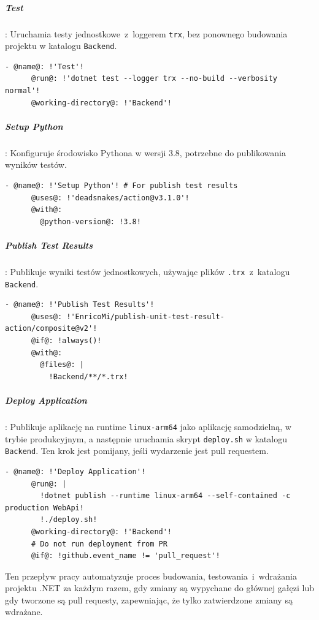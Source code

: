 \subparagraph{Test}: Uruchamia testy jednostkowe~z~loggerem \texttt{\textcolor{codeblue}{trx}}, bez ponownego budowania projektu w katalogu \texttt{\textcolor{codeblue}{Backend}}.
\begin{lstlisting}[style=yaml-colored]
    - @name@: !'Test'!
      @run@: !'dotnet test --logger trx --no-build --verbosity normal'!
      @working-directory@: !'Backend'!
\end{lstlisting}

\subparagraph{Setup Python}: Konfiguruje środowisko Pythona w wersji 3.8, potrzebne do publikowania wyników testów.
\begin{lstlisting}[style=yaml-colored]
    - @name@: !'Setup Python'! # For publish test results
      @uses@: !'deadsnakes/action@v3.1.0'!
      @with@:
        @python-version@: !3.8!
\end{lstlisting}

\subparagraph{Publish Test Results}: Publikuje wyniki testów jednostkowych, używając plików \texttt{\textcolor{codeblue}{.trx}}~z~katalogu \texttt{\textcolor{codeblue}{Backend}}.
\begin{lstlisting}[style=yaml-colored]
    - @name@: !'Publish Test Results'!
      @uses@: !'EnricoMi/publish-unit-test-result-action/composite@v2'!
      @if@: !always()!
      @with@:
        @files@: |
          !Backend/**/*.trx!
\end{lstlisting}

\subparagraph{Deploy Application}: Publikuje aplikację na runtime \texttt{\textcolor{codeblue}{linux-arm64}} jako aplikację samodzielną, w trybie produkcyjnym, a następnie uruchamia skrypt \texttt{\textcolor{codeblue}{deploy.sh}} w katalogu \texttt{\textcolor{codeblue}{Backend}}. Ten krok jest pomijany, jeśli wydarzenie jest pull requestem.
\begin{lstlisting}[style=yaml-colored]
    - @name@: !'Deploy Application'!
      @run@: |
        !dotnet publish --runtime linux-arm64 --self-contained -c production WebApi!
        !./deploy.sh!
      @working-directory@: !'Backend'!
      # Do not run deployment from PR
      @if@: !github.event_name != 'pull_request'!
\end{lstlisting}

Ten przepływ pracy automatyzuje proces budowania, testowania~i~wdrażania projektu .NET za każdym razem, gdy zmiany są wypychane do głównej gałęzi lub gdy tworzone są pull requesty, zapewniając, że tylko zatwierdzone zmiany są wdrażane.

